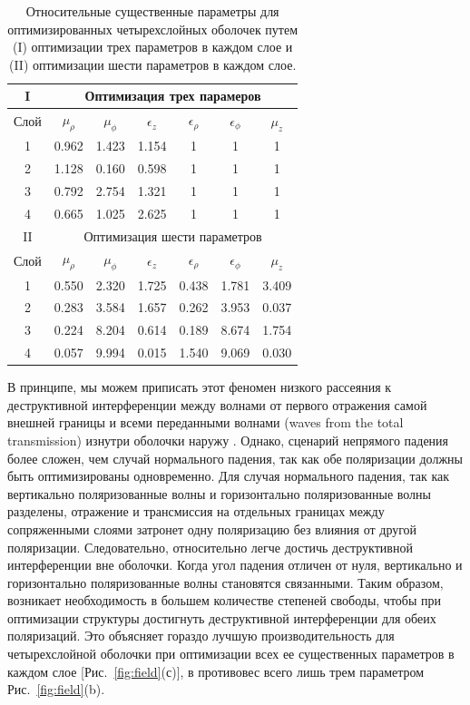 \documentclass[a4paper, 12pt]{article}
\begin{document}
\begin{table}
\begin{center}
\begin{tabular}{|c|ccc|ccc|}
\hline
 I&\multicolumn{6}{c|}{Оптимизация трех парамеров} \\
\hline
 Слой & $\mu_{\rho}$ & $\mu_{\phi}$ & $\epsilon_{z}$  & $\epsilon_{\rho}$ & $\epsilon_{\phi}$ & $\mu_{z}$ \\
\hline
1 & 0.962 & 1.423 & 1.154 & 1 & 1 & 1\\
 2 & 1.128 &0.160  &  0.598 & 1 & 1 & 1\\
 3 & 0.792 & 2.754 & 1.321 &1 &  1 & 1\\
 4 & 0.665 & 1.025 & 2.625 &1 &  1 & 1 \\
 \hline
  II&\multicolumn{6}{c|}{Оптимизация шести параметров} \\
\hline
 Слой & $\mu_{\rho}$ & $\mu_{\phi}$ & $\epsilon_{z}$  & $\epsilon_{\rho}$ & $\epsilon_{\phi}$ & $\mu_{z}$ \\
\hline
1 & 0.550 & 2.320 & 1.725 & 0.438 & 1.781 & 3.409\\
 2 & 0.283 & 3.584 & 1.657 &  0.262 & 3.953 & 0.037\\
 3 & 0.224 & 8.204 & 0.614& 0.189 & 8.674 & 1.754\\
 4 & 0.057 & 9.994 & 0.015 & 1.540 & 9.069 & 0.030 \\
\hline
\end{tabular}
\caption{\label{table:params} Относительные существенные параметры для
оптимизированных четырехслойных оболочек путем (I) оптимизации трех
параметров в каждом слое и (II) оптимизации шести параметров в каждом слое.}
\end{center}
\end{table}

В принципе, мы можем приписать этот феномен низкого рассеяния к
деструктивной интерференции между волнами от первого отражения самой внешней
границы и всеми переданными волнами (waves from the total transmission) 
изнутри оболочки наружу \cite{12}. 
Однако, сценарий непрямого падения более сложен,
чем случай нормального падения, так как обе поляризации должны быть 
оптимизированы одновременно. Для случая нормального падения, так как 
вертикально поляризованные волны и горизонтально поляризованные волны 
разделены, отражение и трансмиссия на отдельных границах между сопряженными
слоями затронет одну поляризацию без влияния от другой поляризации. 
Следовательно, относительно легче достичь деструктивной интерференции
вне оболочки. Когда угол падения отличен от нуля, вертикально и горизонтально
поляризованные волны становятся связанными. Таким образом, возникает
необходимость в большем количестве степеней свободы, чтобы при оптимизации
структуры достигнуть деструктивной интерференции для обеих поляризаций.
Это объясняет гораздо лучшую производительность для четырехслойной оболочки
при оптимизации всех ее существенных параметров в каждом слое 
[Рис.~\ref{fig:field}(с)], в противовес всего лишь трем параметром
Рис.~\ref{fig:field}(b).
\end{document}
